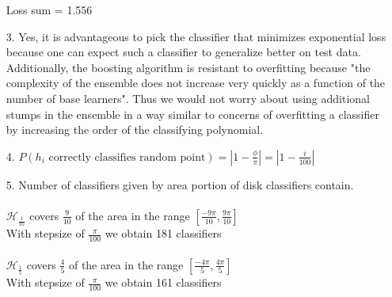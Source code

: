\documentclass{article}
\begin{document}
\begin{enumerate}
		Loss sum = 1.556\\

\newpage

\item[3.]
	Yes, it is advantageous to pick the classifier that minimizes exponential loss because one can expect such a classifier to generalize better on test data. Additionally, the boosting algorithm is resistant to overfitting because "the complexity of the ensemble does not increase very quickly as a function of the number of base learners". Thus we would not worry about using additional stumps in the ensemble in a way similar to concerns of overfitting a classifier by increasing the order of the classifying polynomial.

\bigskip

\item[4.]
	 $P(h_i \text{ correctly classifies random point}) = |1 - \frac{\phi}{\pi} | = | 1 - \frac{i}{100} | $

\bigskip

\item[5.]
	 Number of classifiers given by area portion of disk classifiers contain.\\
	 \medskip\\
	 $\mathcal{H}_\frac{1}{10}$ covers $\frac{9}{10}$ of the area in the range $[\frac{-9\pi}{10}, \frac{9\pi}{10}]$\\

	 With stepsize of $\frac{\pi}{100}$ we obtain 181 classifiers\\
	 \bigskip\\
	 $\mathcal{H}_\frac{1}{5}$ covers $\frac{4}{5}$ of the area in the range $[\frac{-4\pi}{5}, \frac{4\pi}{5}]$\\

	 With stepsize of $\frac{\pi}{100}$ we obtain 161 classifiers\\

\newpage


\end{enumerate}
\end{document}
